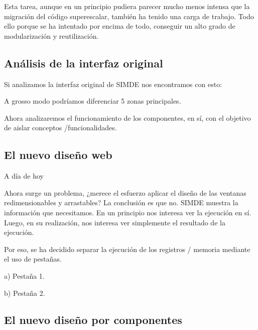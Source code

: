 Esta tarea, aunque en un principio pudiera parecer mucho menos intensa que la migración del código 
superescalar, también ha tenido una carga de trabajo. Todo ello porque se ha intentado por encima 
de todo, conseguir un alto grado de modularización y reutilización. 

\subsection{Análisis de la interfaz original}

Si analizamos la interfaz original de SIMDE nos encontramos con esto: 

A grosso modo podríamos diferenciar 5 zonas principales.

Ahora analizaremos el funcionamiento de los componentes, en sí, con el objetivo de aislar conceptos
/funcionalidades.

\subsection{El nuevo diseño web}

A día de hoy 

\bigskip
Ahora surge un problema, ¿merece el esfuerzo aplicar el diseño de las ventanas redimensionables y 
arrastables? La conclusión es que no. SIMDE muestra la información que necesitamos. En un 
principio nos interesa ver la ejecución en sí. Luego, en su realización, nos interesa ver simplemente
el resultado de la ejecución.

\bigskip
Por eso, se ha decidido separar la ejecución de los registros / memoria mediante el uso de pestañas.

a) Pestaña 1.

b) Pestaña 2.

\subsection{El nuevo diseño por componentes}